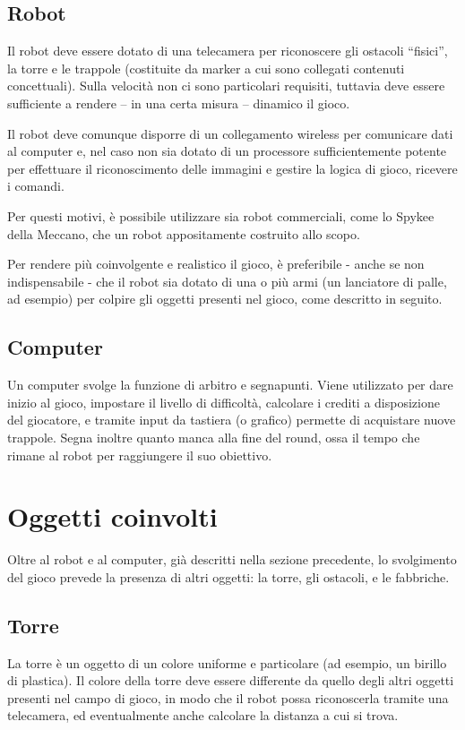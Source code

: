 \subsection*{Robot}
Il robot deve essere dotato di una telecamera per riconoscere gli ostacoli “fisici”, la torre e le trappole (costituite da marker a cui sono collegati contenuti concettuali). Sulla velocità non ci sono particolari requisiti, tuttavia deve essere sufficiente a rendere – in una certa misura – dinamico il gioco.

Il robot deve comunque disporre di un collegamento wireless per comunicare dati al computer e, nel caso non sia dotato di un processore sufficientemente potente per effettuare il riconoscimento delle immagini e gestire la logica di gioco, ricevere i comandi.

Per questi motivi, è possibile utilizzare sia robot commerciali, come lo Spykee della Meccano, che un robot appositamente costruito allo scopo.

Per rendere più coinvolgente e realistico il gioco, è preferibile - anche se non indispensabile - che il robot sia dotato di una o più armi (un lanciatore di palle, ad esempio) per colpire gli oggetti presenti nel gioco, come descritto in seguito.

\subsection*{Computer} Un computer svolge la funzione di arbitro e segnapunti. Viene utilizzato per dare inizio al gioco, impostare il livello di difficoltà, calcolare i crediti a disposizione del giocatore, e tramite input da tastiera (o grafico) permette di acquistare nuove trappole. Segna inoltre quanto manca alla fine del round, ossa il tempo che rimane al robot per raggiungere il suo obiettivo.

\section{Oggetti coinvolti}
Oltre al robot e al computer, già descritti nella sezione precedente, lo svolgimento del gioco prevede la presenza di altri oggetti: la torre, gli ostacoli, e le fabbriche.

\subsection*{Torre} La torre è un oggetto di un colore uniforme e particolare (ad esempio, un birillo di plastica). Il colore della torre deve essere differente da quello degli altri oggetti presenti nel campo di gioco, in modo che il robot possa riconoscerla tramite una telecamera, ed eventualmente anche calcolare la distanza a cui si trova. 

